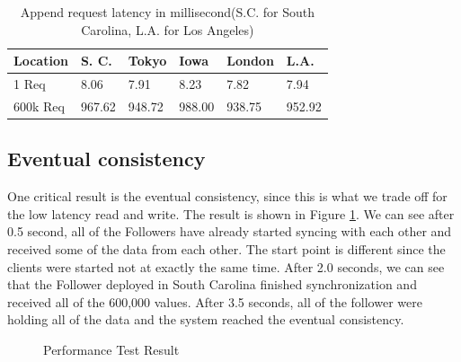 \documentclass[11pt,english,twocolumn]{article}
\begin{document}
\begin{table}[h]
\small
\centering 
\begin{tabular}{ |p{1.6cm}|p{1cm}|p{0.8cm}|p{0.8cm}|p{1cm}|p{0.8cm}|  }
\hline
Location & S. C. & Tokyo & Iowa & London & L.A. \\
 \hline
 1 Req   & 8.06 & 7.91 & 8.23 & 7.82 & 7.94\\
\hline
600k Req & 967.62 & 948.72 & 988.00 & 938.75 & 952.92\\
 \hline
\end{tabular}
\caption{Append request latency in millisecond(S.C. for South Carolina, L.A. for Los Angeles)}
\label{AppendLatency}
\end{table}

 \vspace{-0.5cm}
\subsection{Eventual consistency}
One critical result is the eventual consistency, since this is what we trade off for the low latency read and write. The result is shown in Figure \ref{ConsistencyDelay}. We can see after 0.5 second, all of the Followers have already started syncing with each other and received some of the data from each other. The start point is different since the clients were started not at exactly the same time. After 2.0 seconds, we can see that the Follower deployed in South Carolina finished synchronization and received all of the 600,000 values. After 3.5 seconds, all of the follower were holding all of the data and the system reached the eventual consistency.

\begin{figure}[h]
\caption{Performance Test Result}
\vspace{-0.4cm}
\label{ConsistencyDelay}
\end{figure}
\end{document}
